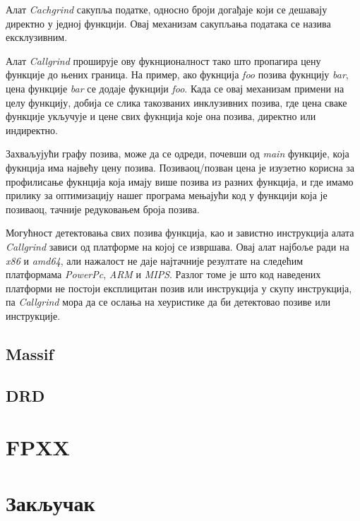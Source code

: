 \documentclass[12pt,oneside]{memoir}
\begin{document}
\indent Алат \textit{Cachgrind} сакупља податке, односно броји догађаје који се дешавају директно у једној функцији. Овај механизам сакупљања података се назива ексклузивним.

\indent Алат \textit{Callgrind} проширује ову фукнционалност тако што пропагира цену функције до њених граница. На пример, ако фукнција \textit{foo} позива фукнцију \textit{bar}, цена функције \textit{bar} се додаје фукнцији \textit{foo}. Када се овај механизам примени на целу функцију, добија се слика такозваних инклузивних позива, где цена сваке функције укључује и цене свих фукнција које она позива, директно или индиректно.

\indent Захваљујући графу позива, може да се одреди, почевши од \textit{main} функције, која фукнција има највећу цену позива. Позиваоц/позван цена је изузетно корисна за профилисање фукнција која имају више позива из разних функција, и где имамо прилику за оптимизацију нашег програма мењајући код у функцији која је позиваоц, тачније редуковањем броја позива.

\indent Могућност детектовања свих позива функција, као и завистно инструкција алата  \textit{Callgrind} зависи од платформе на којој се извршава. Овај алат најбоље ради на \textit{x86} и \textit{amd64}, али нажалост не даје најтачније резултате на следећим платформама \textit{PowerPc}, \textit{ARM} и \textit{MIPS}. Разлог томе је што код наведених платформи не постоји експлицитан позив или инструкција у скупу инструкција, па  \textit{Callgrind} мора да се ослања на хеуристике да би детектовао позиве или инструкције.


\section{Massif}



\section{DRD}

\chapter{FPXX}
\label{chp:fpxx}

\chapter{Закључак}

\end{document}
